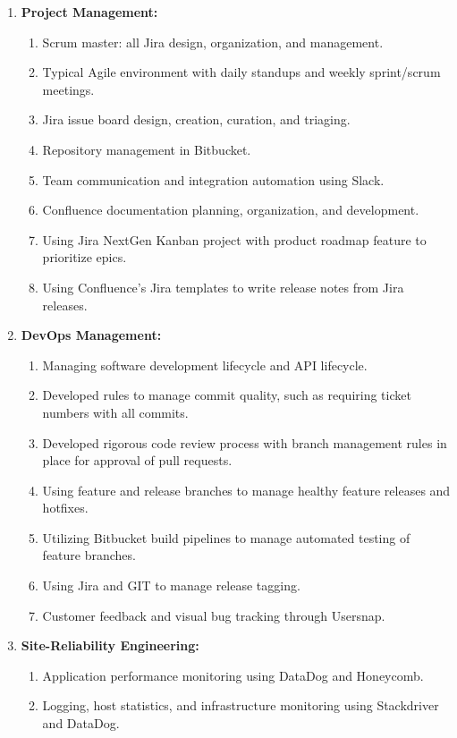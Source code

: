\documentclass[oneside]{article}%
\begin{document}
\begin{enumerate}[]
\begin{enumerate}[]
\begin{enumerate}[-]
				\end{enumerate}
			\item \textbf{Project Management:}
				\begin{enumerate}[-]
					\item Scrum master: all Jira design, organization, and management.
					\item Typical Agile environment with daily standups and weekly sprint/scrum meetings.
					\item Jira issue board design, creation, curation, and triaging.
					\item Repository management in Bitbucket.
					\item Team communication and integration automation using Slack.
					\item Confluence documentation planning, organization, and development.
					\item Using Jira NextGen Kanban project with product roadmap feature to prioritize epics.
					\item Using Confluence's Jira templates to write release notes from Jira releases.
				\end{enumerate}
			\item \textbf{DevOps Management:}
				\begin{enumerate}[-]
					\item Managing software development lifecycle and API lifecycle.
					\item Developed rules to manage commit quality, such as requiring ticket numbers with all commits.
					\item Developed rigorous code review process with branch management rules in place for approval of pull requests.
					\item Using feature and release branches to manage healthy feature releases and hotfixes.
					\item Utilizing Bitbucket build pipelines to manage automated testing of feature branches.
					\item Using Jira and GIT to manage release tagging.
					\item Customer feedback and visual bug tracking through Usersnap.
				\end{enumerate}
			\item \textbf{Site-Reliability Engineering:}
				\begin{enumerate}[-]
					\item Application performance monitoring using DataDog and Honeycomb.
					\item Logging, host statistics, and infrastructure monitoring using Stackdriver and DataDog.

\end{enumerate}
\end{enumerate}
\end{enumerate}
\end{document}
